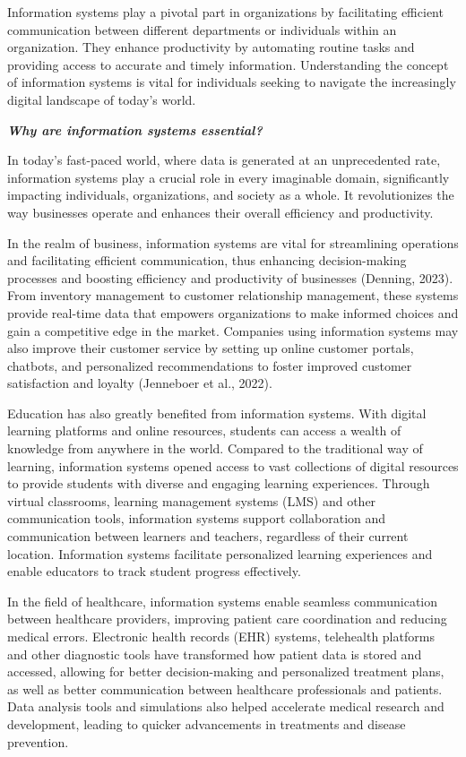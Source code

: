 \documentclass[
  letterpaper,
  DIV=11,
  numbers=noendperiod]{scrreprt}
\begin{document}
Information systems play a pivotal part in organizations by facilitating
efficient communication between different departments or individuals
within an organization. They enhance productivity by automating routine
tasks and providing access to accurate and timely information.
Understanding the concept of information systems is vital for
individuals seeking to navigate the increasingly digital landscape of
today's world.

\textbf{\emph{Why are information systems essential?}}

In today's fast-paced world, where data is generated at an unprecedented
rate, information systems play a crucial role in every imaginable
domain, significantly impacting individuals, organizations, and society
as a whole. It revolutionizes the way businesses operate and enhances
their overall efficiency and productivity.

In the realm of business, information systems are vital for streamlining
operations and facilitating efficient communication, thus enhancing
decision-making processes and boosting efficiency and productivity of
businesses (Denning, 2023). From inventory management to customer
relationship management, these systems provide real-time data that
empowers organizations to make informed choices and gain a competitive
edge in the market. Companies using information systems may also improve
their customer service by setting up online customer portals, chatbots,
and personalized recommendations to foster improved customer
satisfaction and loyalty (Jenneboer et al., 2022).

Education has also greatly benefited from information systems. With
digital learning platforms and online resources, students can access a
wealth of knowledge from anywhere in the world. Compared to the
traditional way of learning, information systems opened access to vast
collections of digital resources to provide students with diverse and
engaging learning experiences. Through virtual classrooms, learning
management systems (LMS) and other communication tools, information
systems support collaboration and communication between learners and
teachers, regardless of their current location. Information systems
facilitate personalized learning experiences and enable educators to
track student progress effectively.

In the field of healthcare, information systems enable seamless
communication between healthcare providers, improving patient care
coordination and reducing medical errors. Electronic health records
(EHR) systems, telehealth platforms and other diagnostic tools have
transformed how patient data is stored and accessed, allowing for better
decision-making and personalized treatment plans, as well as better
communication between healthcare professionals and patients. Data
analysis tools and simulations also helped accelerate medical research
and development, leading to quicker advancements in treatments and
disease prevention.
\end{document}
